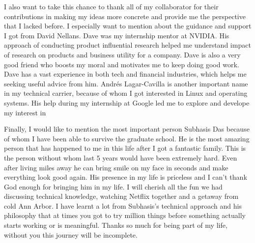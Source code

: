 I also want to take this chance to thank all of my collaborator for their
contributions in making my ideas more concrete and provide me the perspective
that I lacked before. I especially want to mention about the guidance and
support I got from David Nellans. Dave was my internship mentor at NVIDIA.
His approach of conducting product influential research helped
me understand impact of research on products and business utility for a company.
Dave is also a very good friend who boosts my moral and motivates me to keep
doing good work. Dave has a vast experience in both tech and financial
industries, which helps me seeking useful advice from him. Andr\'es
Lagar-Cavilla is another important name in my technical carrier, because of whom
I got interested in Linux and operating systems. His help during my internship
at Google led me to explore and develope my interest in 


Finally, I would like to mention the most important person Subhasis Das because
of whom I have been able to survive the graduate school. He is the most amazing
person that has happened to me in this life after I got a fantastic family. This
is the person without whom last 5 years would have been extremely hard. Even
after living miles away he can bring smile on my face in seconds and make
everything look good again. His presence in my life is priceless and I can't
thank God enough for bringing him in my life.  I will cherish all the fun we had
discussing technical knowledge, watching Netflix together and a getaway from
cold Ann Arbor. I have learnt a lot from Subhasis's technical approach and his
philosophy that at times you got to try million things before something actually
starts working or is meaningful. Thanks so much for being part of my life,
without you this journey will be incomplete.
